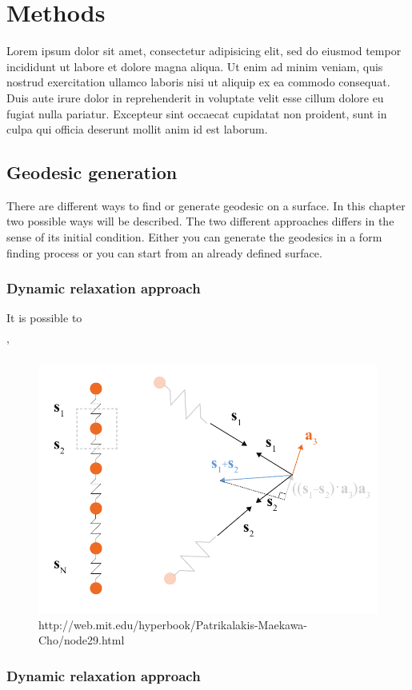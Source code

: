 \chapter{Methods}



Lorem ipsum dolor sit amet, consectetur adipisicing elit, sed do eiusmod tempor incididunt ut labore et dolore magna aliqua. Ut enim ad minim veniam, quis nostrud exercitation ullamco laboris nisi ut aliquip ex ea commodo consequat. Duis aute irure dolor in reprehenderit in voluptate velit esse cillum dolore eu fugiat nulla pariatur. Excepteur sint occaecat cupidatat non proident, sunt in culpa qui officia deserunt mollit anim id est laborum.


\section{Geodesic generation}

There are different ways to find or generate geodesic on a surface. In this chapter two possible ways will be described. The two different approaches differs in the sense of its initial condition. Either you can generate the geodesics in a form finding process or you can start from an already defined surface.

\subsection{Dynamic relaxation approach}

It is possible to


'
\begin{figure}[H]
\centering
\includegraphics[width = 0.7\linewidth ]{figure/Method/GeodesicDyn.pdf}
\caption{http://web.mit.edu/hyperbook/Patrikalakis-Maekawa-Cho/node29.html}
\end{figure}

\subsection{Dynamic relaxation approach}
